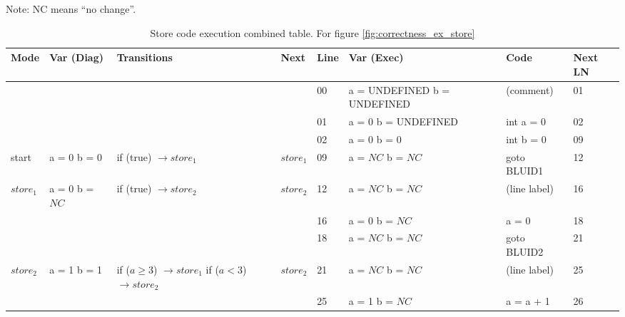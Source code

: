Note: NC means ``no change''.

\begin{table}[htcb]
	\caption{Store code execution combined table. For figure \ref{fig:correctness_ex_store}}
	\centering
	\tablefontsize
		\begin{tabular}{| p{} | p{} | p{} | p{} | p{} | p{} | p{} | p{} |}
			\hline
			\textbf{Mode} 		&	\textbf{Var (Diag)} 		& 	\textbf{Transitions} 		& 	\textbf{Next}		&	\textbf{Line}		&	\textbf{Var (Exec)	}	&	\textbf{Code}	&	\textbf{Next LN} \\
			\hline			
								&								&								&						&	00					& 	a = UNDEFINED \newline	b = UNDEFINED	&	(comment)		&	01	\\
			\hline
								&								&								&						&	01					&	a = 0 \newline b = UNDEFINED	&	int a = 0				&	02	\\
			\hline
								&								&								&						&	02					&	a = 0 \newline b = 0		&	int b = 0					& 	09	\\
			\hline
			start				&	a = 0 \newline b = 0		&	if (true) $\rightarrow store_1$	& $store_1$			&	09					&	a = $NC$ \newline b = $NC$	&	goto BLUID1					&	12	\\
			\hline
			$store_1$			&	a = 0 \newline b = $NC$		&	if (true) $\rightarrow store_2$ & $store_2$			&	12					&	a = $NC$ \newline b = $NC$	&	(line label)				&	16	\\
			\hline
								&								&								&						&	16					&	a = 0 \newline b = $NC$		&	a = 0						&	18	\\
			\hline
								&								&								&						&	18					&	a = $NC$ \newline b = $NC$	&	goto BLUID2					&	21	\\
			\hline	
			$store_2$			&	a = 1	\newline b = 1		&	if ($a \geq 3$) $\rightarrow store_1$ \newline
																	if ($a < 3$) $\rightarrow store_2$ &	$store_2$	&	21					&	a = $NC$ \newline b = $NC$	&	(line label)				&	25	\\
			\hline
								&								&								&						&	25					&	a = 1 \newline b = $NC$		&		a = a + 1				&	26	\\

\end{tabular}
\end{table}

